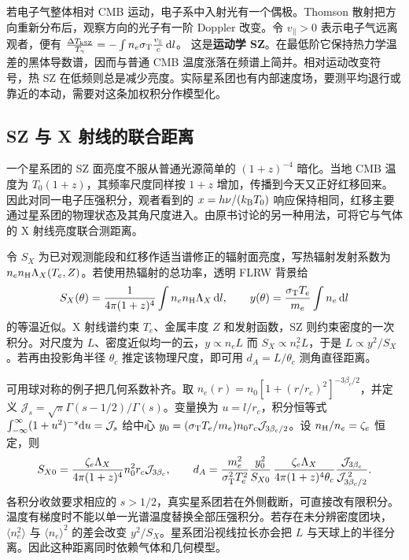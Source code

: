 若电子气整体相对 CMB 运动，电子系中入射光有一个偶极。Thomson 散射把方向重新分布后，观察方向的光子有一阶 Doppler 改变。令 $v_\parallel>0$ 表示电子气远离观者，便有 $\frac{\Delta T_{\rm kSZ}}{T_\gamma} =-\int n_e\sigma_{\rm T}\frac{v_\parallel}{c}\,\dd l$。
这是\textbf{运动学 SZ}。在最低阶它保持热力学温差的黑体导数谱，因而与普通 CMB 温度涨落在频谱上简并。相对运动改变符号，热 SZ 在低频则总是减少亮度。实际星系团也有内部速度场，要测平均退行或靠近的本动，需要对这条加权积分作模型化。

\subsection{SZ 与 X 射线的联合距离}

一个星系团的 SZ 面亮度不服从普通光源简单的 $(1+z)^{-4}$ 暗化。当地 CMB 温度为 $T_0(1+z)$，其频率尺度同样按 $1+z$ 增加，传播到今天又正好红移回来。因此对同一电子压强积分，观者看到的 $x=h\nu/(k_{\rm B}T_0)$ 响应保持相同，红移主要通过星系团的物理状态及其角尺度进入。由原书讨论的另一种用法，可将它与气体的 X 射线亮度联合测距离。

令 $S_X$ 为已对观测能段和红移作适当谱修正的辐射面亮度，写热辐射发射系数为 $n_en_{\rm H}\Lambda_X(T_e,Z)$。若使用热辐射的总功率，透明 FLRW 背景给
\[
 S_X(\theta)=\frac{1}{4\pi(1+z)^4}\int
 n_e n_{\rm H}\Lambda_X\,\dd l,\qquad
 y(\theta)=\frac{\sigma_{\rm T}T_e}{m_e}
 \int n_e\,\dd l
\]
的等温近似。X 射线谱约束 $T_e$、金属丰度 $Z$ 和发射函数，SZ 则约束密度的一次积分。对尺度为 $L$、密度近似均一的云，$y\propto n_eL$ 而 $S_X\propto n_e^2L$，于是 $L\propto y^2/S_X$。若再由投影角半径 $\theta_c$ 推定该物理尺度，即可用 $d_A=L/\theta_c$ 测角直径距离。

可用球对称的例子把几何系数补齐。取 $n_e(r)=n_0[1+(r/r_c)^2]^{-3\beta_c/2}$，并定义 $\mathcal J_s=\sqrt{\pi}\Gamma(s-1/2)/\Gamma(s)$。变量换为 $u=l/r_c$，积分恒等式 $\int_{-\infty}^\infty(1+u^2)^{-s}\dd u=\mathcal J_s$ 给中心 $y_0=(\sigma_{\rm T}T_e/m_e)n_0r_c\mathcal J_{3\beta_c/2}$。设 $n_{\rm H}/n_e=\zeta_e$ 恒定，则
\[
 S_{X0}=\frac{\zeta_e\Lambda_X}{4\pi(1+z)^4}
 n_0^2r_c\mathcal J_{3\beta_c},\qquad
 d_A=\frac{m_e^2}{\sigma_{\rm T}^2T_e^2}
 \frac{y_0^2}{S_{X0}}\,
 \frac{\zeta_e\Lambda_X}{4\pi(1+z)^4\theta_c}
 \frac{\mathcal J_{3\beta_c}}{\mathcal J_{3\beta_c/2}^{\,2}} .
\]
各积分收敛要求相应的 $s>1/2$，真实星系团若在外侧截断，可直接改有限积分。温度有梯度时不能以单一光谱温度替换全部压强积分。若存在未分辨密度团块，$\langle n_e^2\rangle$ 与 $\langle n_e\rangle^2$ 的差会改变 $y^2/S_X$。星系团沿视线拉长亦会把 $L$ 与天球上的半径分离。因此这种距离同时依赖气体和几何模型。

